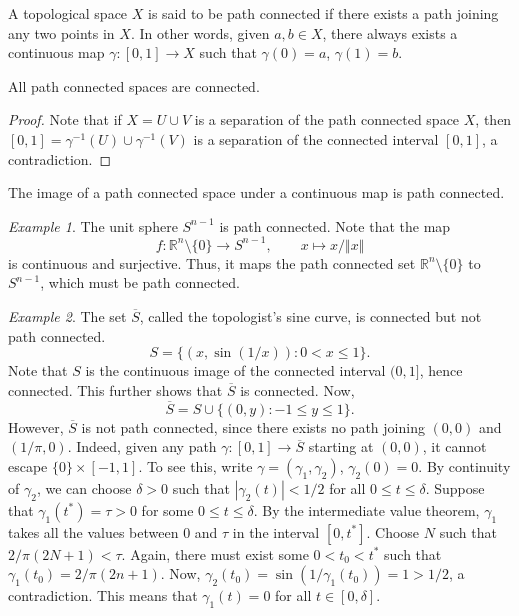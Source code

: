 \documentclass[11pt]{article}
\newcommand{\R}{\mathbb{R}}
\newcommand{\norm}[1]{\Vert #1 \Vert}
\theoremstyle{definition}
\theoremstyle{remark}
\newtheorem*{example}{Example}
\numberwithin{equation}{section}
\begin{document}
    \begin{definition}
        A topological space $X$ is said to be path connected if there exists a path
        joining any two points in $X$. In other words, given $a, b \in X$, there
        always exists a continuous map $\gamma\colon [0, 1] \to X$ such that
        $\gamma(0) = a$, $\gamma(1) = b$.
    \end{definition}

    \begin{lemma}
        All path connected spaces are connected.
    \end{lemma}
    \begin{proof}
        Note that if $X = U \cup V$ is a separation of the path connected space $X$,
        then $[0, 1] = \gamma^{-1}(U) \cup \gamma^{-1}(V)$ is a separation of the
        connected interval $[0, 1]$, a contradiction.
    \end{proof}

    \begin{lemma}
        The image of a path connected space under a continuous map is path connected.
    \end{lemma}
    \begin{example}
        The unit sphere $S^{n - 1}$ is path connected. Note that the map \[
            f\colon \R^n\setminus\{0\} \to S^{n - 1}, \qquad x \mapsto x / \norm{x}
        \] is continuous and surjective. Thus, it maps the path connected set
        $\R^n\setminus\{0\}$ to $S^{n - 1}$, which must be path connected.
    \end{example}
    \begin{example}
        The set $\overline{S}$, called the topologist's sine curve, is connected but
        not path connected. \[
            S = \{(x, \sin(1 / x)): 0 < x \leq 1\}.
        \] Note that $S$ is the continuous image of the connected interval $(0, 1]$,
        hence connected. This further shows that $\overline{S}$ is connected. Now, \[
            \overline{S} = S \cup \{(0, y): -1 \leq y \leq 1\}.
        \] However, $\overline{S}$ is not path connected, since there exists no path
        joining $(0, 0)$ and $(1 / \pi, 0)$. Indeed, given any path $\gamma\colon [0,
        1] \to \overline{S}$ starting at $(0, 0)$, it cannot escape $\{0\}\times [-1,
        1]$. To see this, write $\gamma = (\gamma_1, \gamma_2)$, $\gamma_2(0) = 0$.
        By continuity of $\gamma_2$, we can choose $\delta > 0$ such that
        $|\gamma_2(t)| < 1 / 2$ for all $0 \leq t \leq \delta$. Suppose that
        $\gamma_1(t^*) = \tau > 0$ for some $0 \leq t \leq \delta$. By the
        intermediate value theorem, $\gamma_1$ takes all the values between $0$ and
        $\tau$ in the interval $[0, t^*]$. Choose $N$ such that $2 / \pi(2N + 1) <
        \tau$. Again, there must exist some $0 < t_0 < t^*$ such that $\gamma_1(t_0)
        = 2 / \pi(2n + 1)$. Now, $\gamma_2(t_0) = \sin(1 / \gamma_1(t_0)) = 1 > 1 /
        2$, a contradiction. This means that $\gamma_1(t) = 0$ for all $t \in [0,
        \delta]$.
    \end{example}
\end{document}
